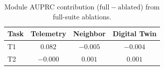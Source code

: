 \begin{table}[!t]
\centering
\caption{Module AUPRC contribution ($\mathrm{full}-\mathrm{ablated}$) from full-suite ablations.}
\label{tab:modules}
\renewcommand{\arraystretch}{1.1}
{\footnotesize\begin{tabular}{lccc}
\toprule
Task & Telemetry & Neighbor & Digital Twin \\
\midrule
T1 & $0.082$ & $-0.005$ & $-0.004$ \\
T2 & $-0.000$ & $0.001$ & $0.001$ \\
\bottomrule
\end{tabular}}
\end{table}
